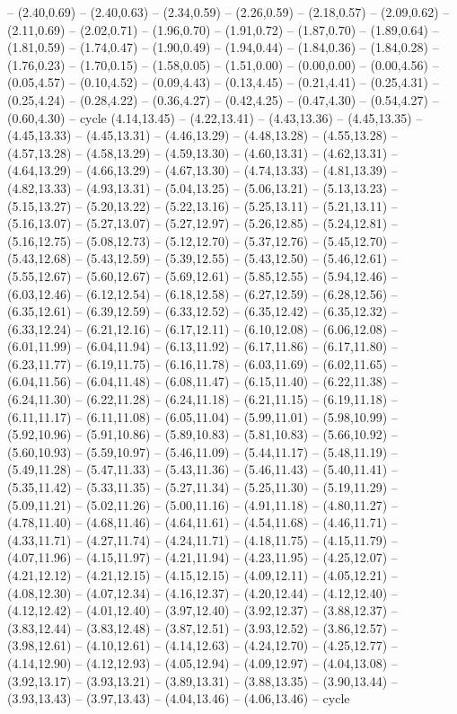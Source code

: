 {-- (2.40,0.69) -- (2.40,0.63) -- (2.34,0.59) -- (2.26,0.59) -- (2.18,0.57) -- (2.09,0.62) -- (2.11,0.69) -- (2.02,0.71) -- (1.96,0.70) -- (1.91,0.72) -- (1.87,0.70) -- (1.89,0.64) -- (1.81,0.59) -- (1.74,0.47) -- (1.90,0.49) -- (1.94,0.44) -- (1.84,0.36) -- (1.84,0.28) -- (1.76,0.23) -- (1.70,0.15) -- (1.58,0.05) -- (1.51,0.00) -- (0.00,0.00) -- (0.00,4.56) -- (0.05,4.57) -- (0.10,4.52) -- (0.09,4.43) -- (0.13,4.45) -- (0.21,4.41) -- (0.25,4.31) -- (0.25,4.24) -- (0.28,4.22) -- (0.36,4.27) -- (0.42,4.25) -- (0.47,4.30) -- (0.54,4.27) -- (0.60,4.30) -- cycle}
\expandafter\def\csname geo:gebiet:DE-SH\endcsname{
  (4.14,13.45) -- (4.22,13.41) -- (4.43,13.36) -- (4.45,13.35) -- (4.45,13.33) -- (4.45,13.31) -- (4.46,13.29) -- (4.48,13.28) -- (4.55,13.28) -- (4.57,13.28) -- (4.58,13.29) -- (4.59,13.30) -- (4.60,13.31) -- (4.62,13.31) -- (4.64,13.29) -- (4.66,13.29) -- (4.67,13.30) -- (4.74,13.33) -- (4.81,13.39) -- (4.82,13.33) -- (4.93,13.31) -- (5.04,13.25) -- (5.06,13.21) -- (5.13,13.23) -- (5.15,13.27) -- (5.20,13.22) -- (5.22,13.16) -- (5.25,13.11) -- (5.21,13.11) -- (5.16,13.07) -- (5.27,13.07) -- (5.27,12.97) -- (5.26,12.85) -- (5.24,12.81) -- (5.16,12.75) -- (5.08,12.73) -- (5.12,12.70) -- (5.37,12.76) -- (5.45,12.70) -- (5.43,12.68) -- (5.43,12.59) -- (5.39,12.55) -- (5.43,12.50) -- (5.46,12.61) -- (5.55,12.67) -- (5.60,12.67) -- (5.69,12.61) -- (5.85,12.55) -- (5.94,12.46) -- (6.03,12.46) -- (6.12,12.54) -- (6.18,12.58) -- (6.27,12.59) -- (6.28,12.56) -- (6.35,12.61) -- (6.39,12.59) -- (6.33,12.52) -- (6.35,12.42) -- (6.35,12.32) -- (6.33,12.24) -- (6.21,12.16) -- (6.17,12.11) -- (6.10,12.08) -- (6.06,12.08) -- (6.01,11.99) -- (6.04,11.94) -- (6.13,11.92) -- (6.17,11.86) -- (6.17,11.80) -- (6.23,11.77) -- (6.19,11.75) -- (6.16,11.78) -- (6.03,11.69) -- (6.02,11.65) -- (6.04,11.56) -- (6.04,11.48) -- (6.08,11.47) -- (6.15,11.40) -- (6.22,11.38) -- (6.24,11.30) -- (6.22,11.28) -- (6.24,11.18) -- (6.21,11.15) -- (6.19,11.18) -- (6.11,11.17) -- (6.11,11.08) -- (6.05,11.04) -- (5.99,11.01) -- (5.98,10.99) -- (5.92,10.96) -- (5.91,10.86) -- (5.89,10.83) -- (5.81,10.83) -- (5.66,10.92) -- (5.60,10.93) -- (5.59,10.97) -- (5.46,11.09) -- (5.44,11.17) -- (5.48,11.19) -- (5.49,11.28) -- (5.47,11.33) -- (5.43,11.36) -- (5.46,11.43) -- (5.40,11.41) -- (5.35,11.42) -- (5.33,11.35) -- (5.27,11.34) -- (5.25,11.30) -- (5.19,11.29) -- (5.09,11.21) -- (5.02,11.26) -- (5.00,11.16) -- (4.91,11.18) -- (4.80,11.27) -- (4.78,11.40) -- (4.68,11.46) -- (4.64,11.61) -- (4.54,11.68) -- (4.46,11.71) -- (4.33,11.71) -- (4.27,11.74) -- (4.24,11.71) -- (4.18,11.75) -- (4.15,11.79) -- (4.07,11.96) -- (4.15,11.97) -- (4.21,11.94) -- (4.23,11.95) -- (4.25,12.07) -- (4.21,12.12) -- (4.21,12.15) -- (4.15,12.15) -- (4.09,12.11) -- (4.05,12.21) -- (4.08,12.30) -- (4.07,12.34) -- (4.16,12.37) -- (4.20,12.44) -- (4.12,12.40) -- (4.12,12.42) -- (4.01,12.40) -- (3.97,12.40) -- (3.92,12.37) -- (3.88,12.37) -- (3.83,12.44) -- (3.83,12.48) -- (3.87,12.51) -- (3.93,12.52) -- (3.86,12.57) -- (3.98,12.61) -- (4.10,12.61) -- (4.14,12.63) -- (4.24,12.70) -- (4.25,12.77) -- (4.14,12.90) -- (4.12,12.93) -- (4.05,12.94) -- (4.09,12.97) -- (4.04,13.08) -- (3.92,13.17) -- (3.93,13.21) -- (3.89,13.31) -- (3.88,13.35) -- (3.90,13.44) -- (3.93,13.43) -- (3.97,13.43) -- (4.04,13.46) -- (4.06,13.46) -- cycle
}
